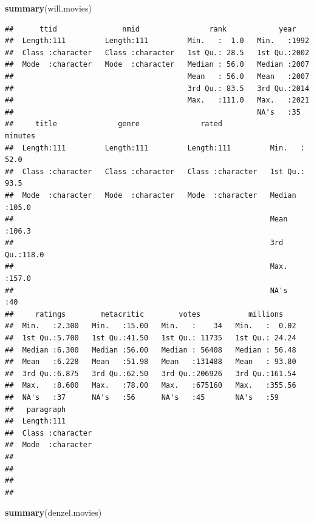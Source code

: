 \documentclass[]{article}
\newenvironment{Shaded}{\begin{snugshade}}{\end{snugshade}}
\newcommand{\KeywordTok}[1]{\textcolor[rgb]{0.13,0.29,0.53}{\textbf{#1}}}
\newcommand{\NormalTok}[1]{#1}
\begin{document}
\begin{Shaded}
\begin{Highlighting}[]
\KeywordTok{summary}\NormalTok{(will.movies)}
\end{Highlighting}
\end{Shaded}

\begin{verbatim}
##      ttid               nmid                rank            year     
##  Length:111         Length:111         Min.   :  1.0   Min.   :1992  
##  Class :character   Class :character   1st Qu.: 28.5   1st Qu.:2002  
##  Mode  :character   Mode  :character   Median : 56.0   Median :2007  
##                                        Mean   : 56.0   Mean   :2007  
##                                        3rd Qu.: 83.5   3rd Qu.:2014  
##                                        Max.   :111.0   Max.   :2021  
##                                                        NA's   :35    
##     title              genre              rated              minutes     
##  Length:111         Length:111         Length:111         Min.   : 52.0  
##  Class :character   Class :character   Class :character   1st Qu.: 93.5  
##  Mode  :character   Mode  :character   Mode  :character   Median :105.0  
##                                                           Mean   :106.3  
##                                                           3rd Qu.:118.0  
##                                                           Max.   :157.0  
##                                                           NA's   :40     
##     ratings        metacritic        votes           millions     
##  Min.   :2.300   Min.   :15.00   Min.   :    34   Min.   :  0.02  
##  1st Qu.:5.700   1st Qu.:41.50   1st Qu.: 11735   1st Qu.: 24.24  
##  Median :6.300   Median :56.00   Median : 56408   Median : 56.48  
##  Mean   :6.228   Mean   :51.98   Mean   :131488   Mean   : 93.80  
##  3rd Qu.:6.875   3rd Qu.:62.50   3rd Qu.:206926   3rd Qu.:161.54  
##  Max.   :8.600   Max.   :78.00   Max.   :675160   Max.   :355.56  
##  NA's   :37      NA's   :56      NA's   :45       NA's   :59      
##   paragraph        
##  Length:111        
##  Class :character  
##  Mode  :character  
##                    
##                    
##                    
## 
\end{verbatim}

\begin{Shaded}
\begin{Highlighting}[]
\KeywordTok{summary}\NormalTok{(denzel.movies)}
\end{Highlighting}
\end{Shaded}
\end{document}
